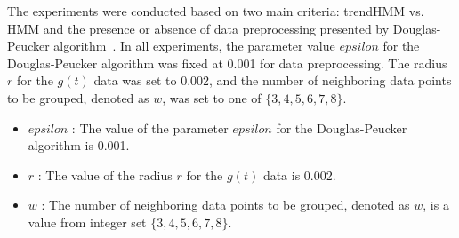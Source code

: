 \documentclass[preprint,12pt]{elsarticle}
\begin{document}
The experiments were conducted based on two main criteria: trendHMM vs. HMM and the presence or absence of data preprocessing presented by Douglas-Peucker algorithm~\cite{saalfeld1999topologically}. In all experiments, the parameter value $epsilon$ for the Douglas-Peucker algorithm was fixed at 0.001 for data preprocessing. The radius $r$ for the $g(t)$ data was set to 0.002, and the number of neighboring data points to be grouped, denoted as $w$, was set to one of $\{3, 4, 5, 6, 7, 8\}$.
\begin{itemize}
	\item $epsilon$ : The value of the parameter $epsilon$ for the Douglas-Peucker algorithm is 0.001.
	\item $r$ : The value of the radius $r$ for the $g(t)$ data is 0.002.
	\item $w$ : The number of neighboring data points to be grouped, denoted as $w$, is a value from integer set $\{3, 4, 5, 6, 7, 8\}$.
\end{itemize}
\end{document}

